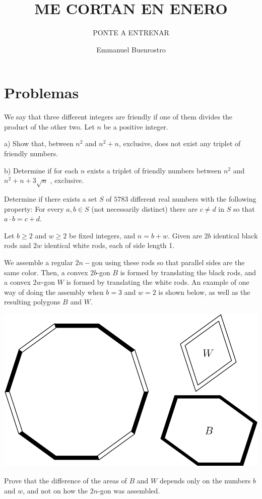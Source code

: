 \documentclass[11pt]{scrartcl}
\title{ME CORTAN EN ENERO }
\subtitle{PONTE A ENTRENAR}
\author{Emmanuel Buenrostro}
\begin{document}
\maketitle

\section{Problemas}
\begin{problem}
We say that three different integers are friendly if one of them divides the product of the other two. Let $n$ be a positive integer.

a) Show that, between $n^2$ and $n^2+n$, exclusive, does not exist any triplet of friendly numbers.

b) Determine if for each $n$ exists a triplet of friendly numbers between $n^2$ and $n^2+n+3\sqrt{n}$ , exclusive.
\end{problem}
\begin{problem}[Israel 2023/6]
Determine if there exists a set $S$ of $5783$ different real numbers with the following property:
For every $a,b\in S$ (not necessarily distinct) there are $c\neq d$ in $S$ so that $a\cdot b=c+d$.
\end{problem}
\begin{problem}[USAMO 2022/2]
    	Let $b\geq2$ and $w\geq2$ be fixed integers, and $n=b+w$. Given are $2b$ identical black rods and $2w$ identical white rods, each of side length 1.

We assemble a regular $2n-$gon using these rods so that parallel sides are the same color. Then, a convex $2b$-gon $B$ is formed by translating the black rods, and a convex $2w$-gon $W$ is formed by translating the white rods. An example of one way of doing the assembly when $b=3$ and $w=2$ is shown below, as well as the resulting polygons $B$ and $W$.

\begin{center}
\includegraphics[scale=0.5]{USAMO2022_2.png}
\end{center}
Prove that the difference of the areas of $B$ and $W$ depends only on the numbers $b$ and $w$, and not on how the $2n$-gon was assembled.
\end{problem}
\end{document}
